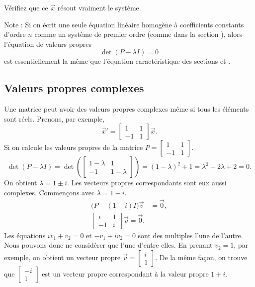 \begin{exercise}
Vérifiez que ce $\vec{x}$ résout vraiment le système.
\end{exercise}

Note : Si on écrit une seule équation linéaire homogène à coefficients constants d’ordre $n$ comme un système de premier ordre (comme dans la section ),
alors l’équation de valeurs propres
\begin{equation*}
\det(P - \lambda I) = 0
\end{equation*}
est essentiellement la même que l’équation caractéristique des sections
 et .

\subsection{Valeurs propres complexes}

Une matrice peut avoir des valeurs propres complexes même si tous les éléments sont réels. Prenons, par exemple,
\begin{equation*}
{\vec{x}}' = 
\begin{bmatrix}
1 & 1 \\
-1 & 1
\end{bmatrix}
\vec{x} .
\end{equation*}
Si on calcule les valeurs propres de la matrice $P = \left[ \begin{smallmatrix} 1 & 1 \\ -1 & 1 \end{smallmatrix}
\right]$.
\begin{equation*}
\det(P - \lambda I) =
\det\left(
\begin{bmatrix}
1-\lambda & 1 \\
-1 & 1-\lambda
\end{bmatrix}
\right)
= {(1-\lambda)}^2 + 1
= \lambda^2 - 2 \lambda + 2 = 0 .
\end{equation*}
On obtient $\lambda = 1 \pm i$.
Les vecteurs propres correspondants sont eux aussi complexes. Commençons avec $\lambda = 1-i$.
\begin{align*}
\bigl(P-(1-i) I\bigr) \vec{v} & = \vec{0} , \\
\begin{bmatrix}
i & 1 \\
-1 & i
\end{bmatrix}
\vec{v} = \vec{0}.
\end{align*}
Les équations $i v_1 + v_2 = 0$ et $-v_1 + iv_2 = 0$
sont des multiples l'une de l'autre. Nous pouvons donc ne considérer que l’une d’entre elles. En prenant $v_2 = 1$, par exemple, on obtient un vecteur propre
$\vec{v} = \left[ \begin{smallmatrix} i \\ 1 \end{smallmatrix} \right]$.
De la même façon, on trouve que
$\left[ \begin{smallmatrix} -i \\ 1 \end{smallmatrix} \right]$
est un vecteur propre correspondant à la valeur propre $1+i$.

